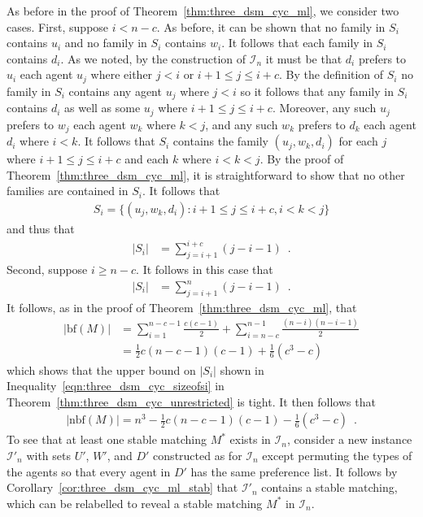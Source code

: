 As before in the proof of Theorem~\ref{thm:three_dsm_cyc_ml}, we consider two cases. First, suppose $i < n - c$. As before, it can be shown that no family in $S_i$ contains $u_i$ and no family in $S_i$ contains $w_i$. It follows that each family in $S_i$ contains $d_i$. As we noted, by the construction of $\mathcal{I}_n$ it must be that $d_i$ prefers to $u_i$ each agent $u_j$ where either $j < i$ or $i + 1 \leq j \leq i + c$. By the definition of $S_i$ no family in $S_i$ contains any agent $u_j$ where $j < i$ so it follows that any family in $S_i$ contains $d_i$ as well as some $u_j$ where $i + 1 \leq j \leq i + c$. Moreover, any such $u_j$ prefers to $w_j$ each agent $w_k$ where $k < j$, and any such $w_k$ prefers to $d_k$ each agent $d_i$ where $i < k$. It follows that $S_i$ contains the family $( u_j, w_k, d_i )$ for each $j$ where $i + 1 \leq j \leq i + c$ and each $k$ where $i < k < j$. By the proof of Theorem~\ref{thm:three_dsm_cyc_ml}, it is straightforward to show that no other families are contained in $S_i$. It follows that 
\begin{align*}
    S_i = \{ ( u_j, w_k, d_i ) : i + 1 \leq j \leq i + c, i < k < j \}
\end{align*}
and thus that
\begin{align*}
    |S_i| &= \sum\limits_{j = i + 1}^{i + c} (j - i - 1)\enspace.
\end{align*}
Second, suppose $i \geq n - c$. It follows in this case that
\begin{align*}
    |S_i| &= \sum\limits_{j = i + 1}^{n} (j - i - 1)\enspace.
\end{align*}
It follows, as in the proof of Theorem~\ref{thm:three_dsm_cyc_ml}, that
\begin{align*}
    |\textrm{bf}(M)| &= \sum\limits_{i=1}^{n - c - 1} \frac{c(c - 1)}{2} + \sum\limits_{i = n - c}^{n - 1} \frac{(n - i)(n - i - 1)}{2}\\
    &= \frac{1}{2}c(n - c - 1)(c - 1) + \frac{1}{6}(c^3 - c)
\end{align*}
which shows that the upper bound on $|S_i|$ shown in Inequality~\ref{eqn:three_dsm_cyc_sizeofsi} in Theorem~\ref{thm:three_dsm_cyc_unrestricted} is tight. It then follows that
\begin{align}
    |\textrm{nbf}(M)| = n^3 - \frac{1}{2}c(n - c - 1)(c - 1) - \frac{1}{6}(c^3 - c) \label{eqn:three_dsm_cyc_ml_sizeofsiintight}\enspace.
\end{align}
To see that at least one stable matching $M^*$ exists in $\mathcal{I}_n$, consider a new instance $\mathcal{I}'_n$ with sets $U'$, $W'$, and $D'$ constructed as for $\mathcal{I}_n$ except permuting the types of the agents so that every agent in $D'$ has the same preference list. It follows by Corollary~\ref{cor:three_dsm_cyc_ml_stab} that $\mathcal{I}'_n$ contains a stable matching, which can be relabelled to reveal a stable matching $M^*$ in $\mathcal{I}_n$.


